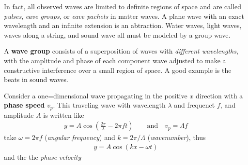         \bulletpar In fact, all observed waves are limited to definite regions of space and are called \textit{pulses}, \textit{eave groups}, or \textit{eave 
        pachets} in matter waves. A plane wave with an exact wavelength and an infinite extension is an abtraction. Water waves, light waves, waves along a string,
        and sound wave all must be modeled by a group wave.

        \starpar A \textbf{wave group} consists of a superposition of waves with \textit{different wavelengths}, with the amplitude and phase of each component
        wave adjusted to make a constructive interference over a small region of space. A good example is the beats in sound waves.

        \bulletpar Consider a one=dimensional wave propagating in the positive $x$ direction with a \textbf{phase speed} $v_p$. This traveling wave with 
        wavelength $\lambda$ and frequenct $f$, and amplitude $A$ is written like 
        \begin{align}
            \label{eq:wave group:1}
            y = A \cos{\left( \frac{2 \pi}{\lambda} - 2 \pi ft \right)} \qquad \text{and} \quad v_p = \Lambda f
        \end{align}
        take $\omega = 2 \pi f$ (\textit{angular frequency}) and $k=2 \pi/\Lambda$ (\textit{wavenumber}), thus 
        \begin{align}
            \label{eq:wave group:2}
            y = A \cos{(k x - \omega t)}
        \end{align}
        and the the \textit{phase velocity}

